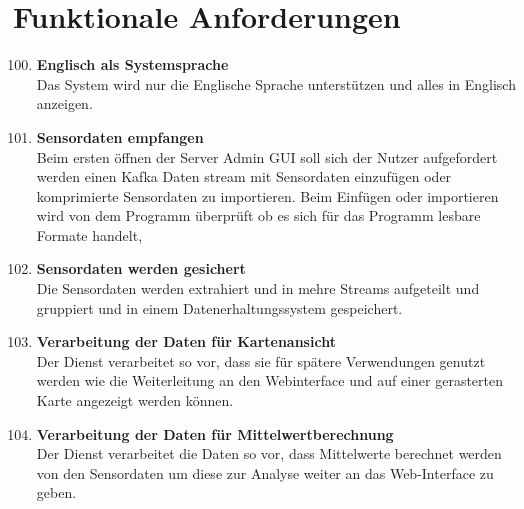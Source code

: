 \chapter{Funktionale Anforderungen}
\begin{enumerate}[label=\textbf{PF\arabic{enumi}0}]
	\setcounter{enumi}{99}
	\section{Pflicht Funktionale Anforderungen}
	\subsection{Server}

	\item \textbf{Englisch als Systemsprache}\\
		Das System wird nur die Englische Sprache unterstützen und alles in Englisch anzeigen. 
	
	\item \textbf{Sensordaten empfangen} \label{A1}\\
		Beim ersten öffnen der Server Admin GUI soll sich der Nutzer aufgefordert werden einen Kafka Daten stream mit Sensordaten einzufügen oder komprimierte Sensordaten zu importieren. Beim Einfügen oder importieren wird von dem Programm überprüft ob es sich für das Programm lesbare Formate handelt, %
		
	\item \textbf{Sensordaten werden gesichert}\\
		Die Sensordaten werden extrahiert und in mehre Streams aufgeteilt und gruppiert und in einem Datenerhaltungssystem gespeichert. %
		
	\item \textbf{Verarbeitung der Daten für Kartenansicht} \label{FAKarten}\\
		Der Dienst verarbeitet so vor, dass sie für spätere Verwendungen genutzt werden wie die Weiterleitung an den Webinterface und auf einer gerasterten Karte angezeigt werden können.
	
	\item \textbf{Verarbeitung der Daten für Mittelwertberechnung} \label{FAMittel}\\
		Der Dienst verarbeitet die Daten so vor, dass Mittelwerte berechnet werden von den Sensordaten um diese zur Analyse weiter an das Web-Interface zu geben.
	

\end{enumerate}

